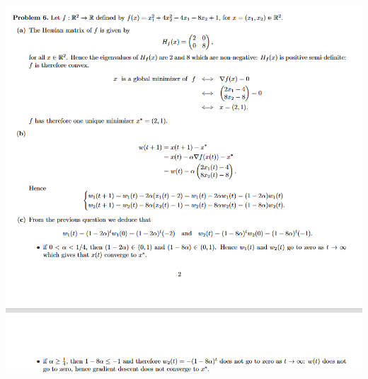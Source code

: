 \documentclass[12pt,twoside]{article}
\begin{document}
\includegraphics[scale=.7]{2019 final q 6.png}
\end{document}
